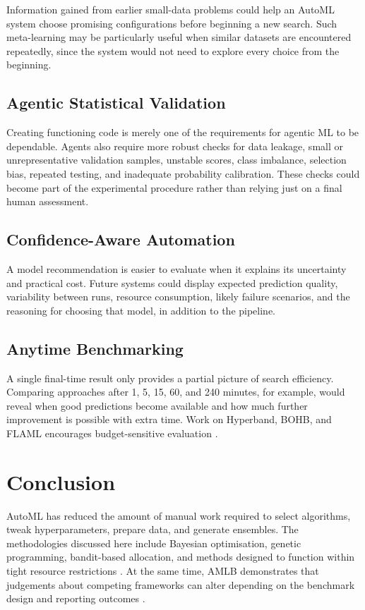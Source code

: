 \documentclass[acmsmall,screen]{acmart}
\begin{document}
Information gained from earlier small-data problems could help an AutoML system choose promising configurations before beginning a new search. Such meta-learning may be particularly useful when similar datasets are encountered repeatedly, since the system would not need to explore every choice from the beginning.

\subsection{Agentic Statistical Validation}

Creating functioning code is merely one of the requirements for agentic ML to be dependable. Agents also require more robust checks for data leakage, small or unrepresentative validation samples, unstable scores, class imbalance, selection bias, repeated testing, and inadequate probability calibration. These checks could become part of the experimental procedure rather than relying just on a final human assessment.

\subsection{Confidence-Aware Automation}

A model recommendation is easier to evaluate when it explains its uncertainty and practical cost. Future systems could display expected prediction quality, variability between runs, resource consumption, likely failure scenarios, and the reasoning for choosing that model, in addition to the pipeline.

\subsection{Anytime Benchmarking}

A single final-time result only provides a partial picture of search efficiency. Comparing approaches after 1, 5, 15, 60, and 240 minutes, for example, would reveal when good predictions become available and how much further improvement is possible with extra time. Work on Hyperband, BOHB, and FLAML encourages budget-sensitive evaluation \cite{li2018,falkner2018,wang2021}.

\section{Conclusion}\label{sec:conclusion}

AutoML has reduced the amount of manual work required to select algorithms, tweak hyperparameters, prepare data, and generate ensembles. The methodologies discussed here include Bayesian optimisation, genetic programming, bandit-based allocation, and methods designed to function within tight resource restrictions \cite{Feurer2015, Olson2016, Li2018, Falkner2018, Wang2021}. At the same time, AMLB demonstrates that judgements about competing frameworks can alter depending on the benchmark design and reporting outcomes \cite{gijsbers2024}.
\end{document}
